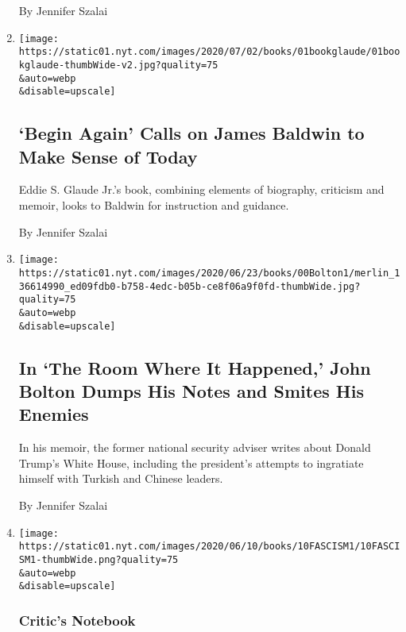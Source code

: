 \begin{enumerate}
  By Jennifer Szalai
\item
  \href{/2020/06/30/books/review-begin-again-james-baldwin-eddie-glaude-jr.html}{}

  \texttt{[image: https://static01.nyt.com/images/2020/07/02/books/01bookglaude/01bookglaude-thumbWide-v2.jpg?quality=75\\\&auto=webp\\\&disable=upscale]}

  \hypertarget{begin-again-calls-on-james-baldwin-to-make-sense-of-today}{%
  \subsection{`Begin Again' Calls on James Baldwin to Make Sense of
  Today}\label{begin-again-calls-on-james-baldwin-to-make-sense-of-today}}

  Eddie S. Glaude Jr.'s book, combining elements of biography, criticism
  and memoir, looks to Baldwin for instruction and guidance.

  By Jennifer Szalai
\item
  \href{/2020/06/17/books/review-room-where-it-happened-john-bolton-memoir.html}{}

  \texttt{[image: https://static01.nyt.com/images/2020/06/23/books/00Bolton1/merlin\_136614990\_ed09fdb0-b758-4edc-b05b-ce8f06a9f0fd-thumbWide.jpg?quality=75\\\&auto=webp\\\&disable=upscale]}

  \hypertarget{in-the-room-where-it-happened-john-bolton-dumps-his-notes-and-smites-his-enemies}{%
  \subsection{In `The Room Where It Happened,' John Bolton Dumps His
  Notes and Smites His
  Enemies}\label{in-the-room-where-it-happened-john-bolton-dumps-his-notes-and-smites-his-enemies}}

  In his memoir, the former national security adviser writes about
  Donald Trump's White House, including the president's attempts to
  ingratiate himself with Turkish and Chinese leaders.

  By Jennifer Szalai
\item
  \href{/2020/06/10/books/fascism-debate-donald-trump.html}{}

  \texttt{[image: https://static01.nyt.com/images/2020/06/10/books/10FASCISM1/10FASCISM1-thumbWide.png?quality=75\\\&auto=webp\\\&disable=upscale]}

  \hypertarget{critics-notebook}{%
  \subsubsection{Critic's Notebook}\label{critics-notebook}}


\end{enumerate}
